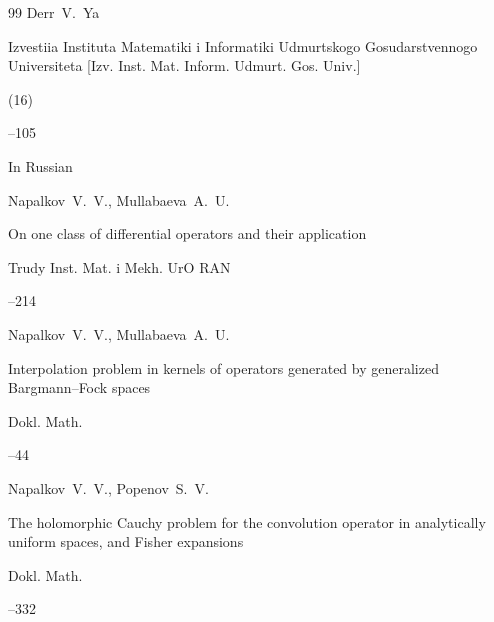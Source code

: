 \begin{thebibliography}{99}
\by Derr~V.~Ya

\jour Izvestiia Instituta Matematiki i Informatiki Udmurtskogo Gosudarstvennogo Universiteta \rm [Izv. Inst. Mat. Inform. Udmurt. Gos. Univ.]


(16)

--105






\lang In Russian

\by Napalkov~V.~V., Mullabaeva~A.~U.

\paper On one class of differential operators and their application

\serial Trudy Inst. Mat. i Mekh. UrO RAN




--214




\by Napalkov~V.~V., Mullabaeva~A.~U.

\paper Interpolation problem in kernels of operators generated by generalized Bargmann--Fock spaces

\jour Dokl. Math. 



--44 









\by Napalkov~V.~V., Popenov~S.~V.

\paper The holomorphic Cauchy problem for the convolution operator in analytically uniform spaces, and Fisher expansions

\jour Dokl. Math. 



--332 






\end{thebibliography}
